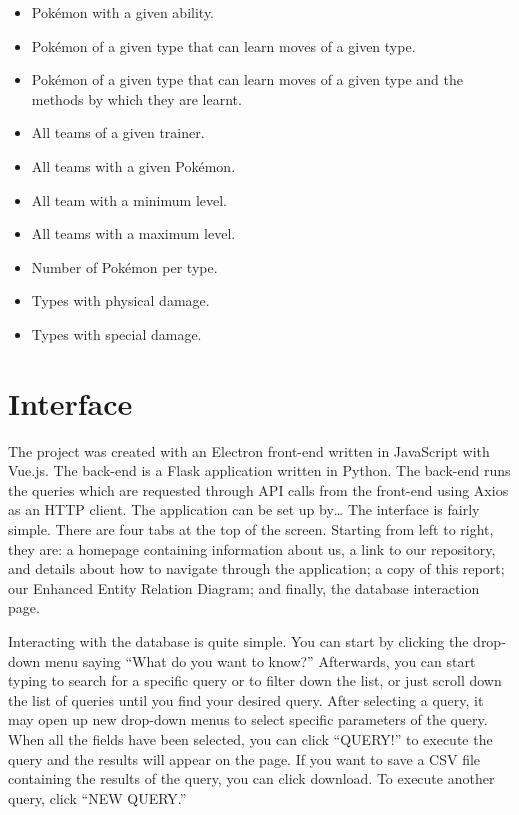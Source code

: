 \documentclass{article}
\begin{document}
\begin{itemize}
    \item Pok\'emon with a given ability.
    \item Pok\'emon of a given type that can learn moves of a given type.
    \item Pok\'emon of a given type that can learn moves of a given type and the methods by which
        they are learnt.
    \item All teams of a given trainer.
    \item All teams with a given Pok\'emon.
    \item All team with a minimum level.
    \item All teams with a maximum level.
    \item Number of Pok\'emon per type.
    \item Types with physical damage.
    \item Types with special damage.
\end{itemize}

\section{Interface}
The project was created with an Electron front-end written in JavaScript with Vue.js. The back-end
is a Flask application written in Python. The back-end runs the queries which are requested 
through API calls from the front-end using Axios as an HTTP client. 
The application can be set up by\dots
{}
The interface is fairly simple. There are four tabs at the top of the screen. Starting from left
to right, they are: a homepage containing information about us, a link to our repository, and
details about how to navigate through the application; a copy of this report; our 
Enhanced Entity Relation Diagram; and finally, the database interaction page.

Interacting with the database is quite simple. You can start by clicking the drop-down menu saying
``What do you want to know?'' Afterwards, you can start typing to search for a specific query or 
to filter down the list, or just scroll down the list of queries until you find your desired 
query. After selecting a query, it may open up new drop-down menus to select specific parameters
of the query. When all the fields have been selected, you can click ``QUERY!'' to execute the 
query and the results will appear on the page. 
If you want to save a CSV file containing the results of the query, you can click download. To 
execute another query, click ``NEW QUERY.''
\end{document}
